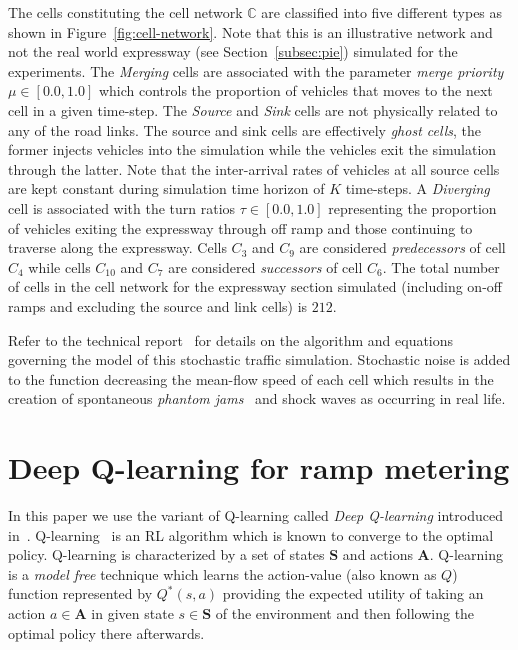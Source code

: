 \documentclass{sig-alternate-05-2015}
\begin{document}
The cells constituting the cell network $\mathbb{C}$ are classified into five different types as shown in Figure~\ref{fig:cell-network}. Note that this is an illustrative network and not the real world expressway (see Section~\ref{subsec:pie}) simulated for the experiments. The {\it Merging} cells are associated with the parameter {\it merge priority} $\mu\in [0.0,1.0]$ which controls the proportion of vehicles that moves to the next cell in a given time-step. The {\it Source} and {\it Sink} cells are not physically related to any of the road links. The source and sink cells are effectively {\it ghost cells}, the former injects vehicles into the simulation while the vehicles exit the simulation through the latter. Note that the inter-arrival rates of vehicles at all source cells are kept constant during simulation time horizon of $K$ time-steps. A {\it Diverging} cell is associated with the turn ratios $\tau \in [0.0,1.0]$ representing the proportion of vehicles exiting the expressway through off ramp and those continuing to traverse along the expressway. Cells $C_3$ and $C_9$ are considered {\it predecessors} of cell $C_4$ while cells $C_{10}$ and $C_7$ are considered {\it successors} of cell $C_6$. The total number of cells  in the cell network for the expressway section simulated (including on-off ramps and excluding the source and link cells) is $212$.

Refer to the technical report~\cite{sunderrajan2016symbiotic} for details on the algorithm and equations governing the model of this stochastic traffic simulation. Stochastic noise is added to the function decreasing the mean-flow speed of each cell which results in the creation of spontaneous {\it phantom jams}~\cite{helbing2001traffic} and shock waves as occurring in real life.

   
   
  
 
\section{Deep Q-learning for ramp metering}
\label{sec:deep-ql}

In this paper we use the variant of Q-learning called {\it Deep Q-learning} introduced in~\cite{mnih2013playing}. Q-learning~\cite{sutton1998reinforcement} is an RL algorithm which is known to converge to the optimal policy. Q-learning is characterized by a set of states $\mathbf{S}$ and actions $\mathbf{A}$.  Q-learning is a {\it model free} technique which learns the action-value (also known as $Q$) function represented by $Q^*(s,a)$ providing the expected utility of taking an action $a\in \mathbf{A}$ in given state $s \in \mathbf{S}$ of the environment and then following the optimal policy there afterwards. 
 
\end{document}
